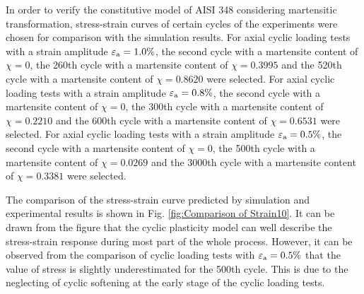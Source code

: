 \documentclass[preprint,5p,twocolumn,10pt,sort&compress]{elsarticle}
\begin{document}
%
%

In order to verify the constitutive model of AISI 348 considering martensitic transformation, stress-strain curves of certain cycles of the experiments were chosen for comparison with the simulation results. For axial cyclic loading tests with a strain amplitude $\varepsilon _{\rm a}=1.0\%$, the second cycle with a martensite content of $\chi=0$, the 260th cycle with a martensite content of $\chi=0.3995$ and the 520th cycle with a martensite content of $\chi=0.8620$ were selected. For axial cyclic loading tests with a strain amplitude $\varepsilon _{\rm a}=0.8\%$, the second cycle with a martensite content of $\chi=0$, the 300th cycle with a martensite content of $\chi=0.2210$ and the 600th cycle with a martensite content of $\chi=0.6531$ were selected. For axial cyclic loading tests with a strain amplitude $\varepsilon _{\rm a}=0.5\%$, the second cycle with a martensite content of $\chi=0$, the 500th cycle with a martensite content of $\chi=0.0269$ and the 3000th cycle with a martensite content of $\chi=0.3381$ were selected.

The comparison of the stress-strain curve predicted by simulation and experimental results is shown in Fig. \ref{fig:Comparison of Strain10}. It can be drawn from the figure that the cyclic plasticity model can well describe the stress-strain response during most part of the whole process. However, it can be observed from the comparison of cyclic loading tests with $\varepsilon _{\rm a}=0.5\%$ that the value of stress is slightly underestimated for the 500th cycle. This is due to the neglecting of cyclic softening at the early stage of the cyclic loading tests.
\end{document}
